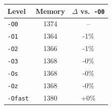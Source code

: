 \begin{tabular*}{\columnwidth}{@{\extracolsep\fill}lcc@{\extracolsep\fill}}
\toprule
\textbf{Level} & \textbf{Memory} & \textbf{$\Delta$ vs.\ \texttt{-O0}} \\
\midrule
\texttt{-O0} & 1374 & -- \\
\texttt{-O1} & 1364 & -1\% \\
\texttt{-O2} & 1366 & -1\% \\
\texttt{-O3} & 1368 & -0\% \\
\texttt{-Os} & 1368 & -0\% \\
\texttt{-Oz} & 1368 & -0\% \\
\texttt{-Ofast} & 1380 & +0\% \\
\bottomrule
\end{tabular*}
